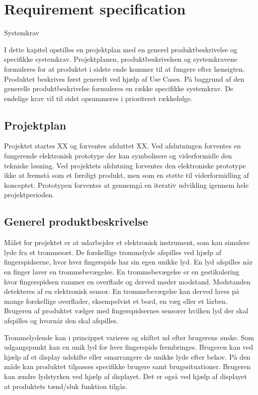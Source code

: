 \chapter{Requirement specification}
\label{kravsspec}

Systemkrav

I dette kapitel opstilles en projektplan med en generel produktbeskrivelse og specifikke systemkrav. Projektplanen, produktbeskrivelsen og systemkravene formuleres for at produktet i sidste ende kommer til at fungere efter hensigten. Produktet beskrives først generelt ved hjælp af Use Cases. På baggrund af den generelle produktbeskrivelse formuleres en række specifikke systemkrav. De endelige krav vil til sidst opsummeres i prioriteret rækkefølge.

\section{Projektplan}
Projektet startes XX og forventes afsluttet XX. Ved afslutningen forventes en fungerende elektronisk prototype der kan symbolisere og viderformidle den tekniske løsning. Ved projektets afslutning forventes den elektroniske prototype ikke at fremstå som et færdigt produkt, men som en støtte til viderformidling af konceptet. Prototypen forventes at gennemgå en iterativ udvikling igennem hele projektperioden. 

\section{Generel produktbeskrivelse}
Målet for projektet er at udarbejder et elektronisk instrument, som kan simulere lyde fra et trommesæt. De forskellige trommelyde afspilles ved hjælp af fingerspidserne, hvor hver fingerspids har sin egen unikke lyd. En lyd afspilles når en finger laver en trommebevægelse. En trommebevægelse er en gestikulering hvor fingerspidsen rammer en overflade og derved møder modstand. Modstanden detekteres af en elektronisk sensor. En trommebevægelse kan derved laves på mange forskellige overflader, eksempelvist et bord, en væg eller et lårben. Brugeren af produktet vælger med fingerspidsernes sensorer hvilken lyd der skal afspilles og hvornår den skal afspilles.

Trommelydende kan i princippet varieres og skiftet ud efter brugerens ønske. Som udgangspunkt kan en unik lyd for hver fingerspids frembringes. Brugeren kan ved hjælp af et display udskifte eller omarrangere de unikke lyde efter behov. På den måde kan produktet tilpasses specifikke brugere samt brugssituationer. Brugeren kan ændre lydstyrken ved hjælp af displayet. Det er også ved hjælp af displayet at produktets tænd/sluk funktion tilgås. 

